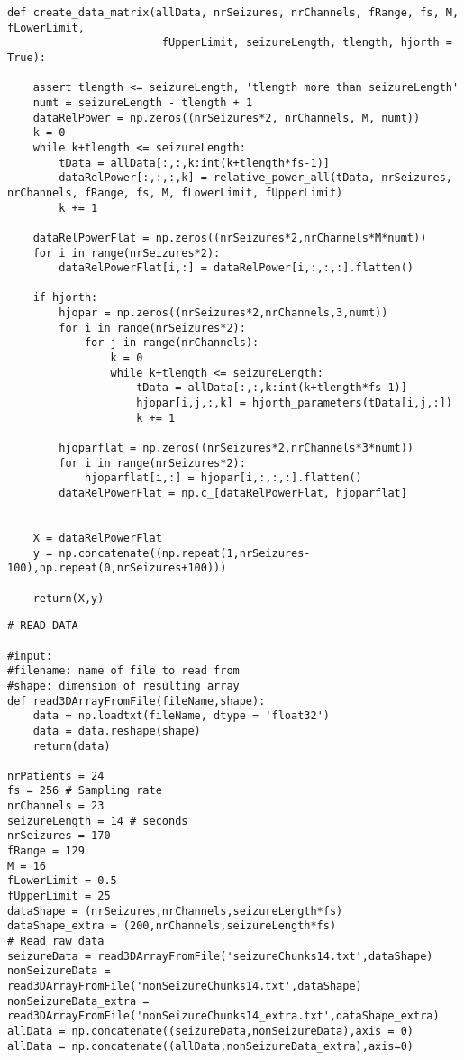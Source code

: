 \documentclass[11pt]{article}
\begin{document}
\begin{verbatim}
def create_data_matrix(allData, nrSeizures, nrChannels, fRange, fs, M, fLowerLimit,
                        fUpperLimit, seizureLength, tlength, hjorth = True):
    
    assert tlength <= seizureLength, 'tlength more than seizureLength'
    numt = seizureLength - tlength + 1
    dataRelPower = np.zeros((nrSeizures*2, nrChannels, M, numt))
    k = 0
    while k+tlength <= seizureLength:
        tData = allData[:,:,k:int(k+tlength*fs-1)]
        dataRelPower[:,:,:,k] = relative_power_all(tData, nrSeizures, nrChannels, fRange, fs, M, fLowerLimit, fUpperLimit)
        k += 1
        
    dataRelPowerFlat = np.zeros((nrSeizures*2,nrChannels*M*numt))
    for i in range(nrSeizures*2):
        dataRelPowerFlat[i,:] = dataRelPower[i,:,:,:].flatten()
        
    if hjorth:
        hjopar = np.zeros((nrSeizures*2,nrChannels,3,numt))
        for i in range(nrSeizures*2):
            for j in range(nrChannels):
                k = 0
                while k+tlength <= seizureLength:
                    tData = allData[:,:,k:int(k+tlength*fs-1)]
                    hjopar[i,j,:,k] = hjorth_parameters(tData[i,j,:])
                    k += 1
                    
        hjoparflat = np.zeros((nrSeizures*2,nrChannels*3*numt))
        for i in range(nrSeizures*2):
            hjoparflat[i,:] = hjopar[i,:,:,:].flatten()
        dataRelPowerFlat = np.c_[dataRelPowerFlat, hjoparflat]
    
    
    X = dataRelPowerFlat
    y = np.concatenate((np.repeat(1,nrSeizures-100),np.repeat(0,nrSeizures+100)))
        
    return(X,y)
\end{verbatim}
\newpage

\begin{verbatim}
# READ DATA

#input: 
#filename: name of file to read from
#shape: dimension of resulting array                   
def read3DArrayFromFile(fileName,shape):                      
    data = np.loadtxt(fileName, dtype = 'float32')
    data = data.reshape(shape)
    return(data)

nrPatients = 24
fs = 256 # Sampling rate
nrChannels = 23
seizureLength = 14 # seconds
nrSeizures = 170
fRange = 129
M = 16
fLowerLimit = 0.5
fUpperLimit = 25
dataShape = (nrSeizures,nrChannels,seizureLength*fs)
dataShape_extra = (200,nrChannels,seizureLength*fs)
# Read raw data
seizureData = read3DArrayFromFile('seizureChunks14.txt',dataShape)
nonSeizureData = read3DArrayFromFile('nonSeizureChunks14.txt',dataShape)
nonSeizureData_extra = read3DArrayFromFile('nonSeizureChunks14_extra.txt',dataShape_extra)
allData = np.concatenate((seizureData,nonSeizureData),axis = 0)
allData = np.concatenate((allData,nonSeizureData_extra),axis=0)
\end{verbatim}
\newpage
\end{document}
